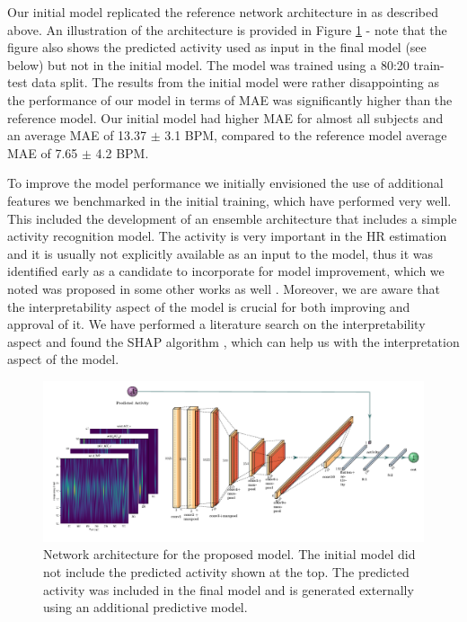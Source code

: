 \documentclass[12pt, conference]{IEEEtran}
\begin{document}
Our initial model replicated the reference network architecture in \cite{reiss2019deep} as described above. An illustration of the architecture is provided in Figure \ref{fig_3} - note that the figure also shows the predicted activity used as input in the final model (see below) but not in the initial model. The model was trained using a 80:20 train-test data split. The results from the initial model were rather disappointing as the performance of our model in terms of MAE was significantly higher than the reference model. Our initial model had higher MAE for almost all subjects and an average MAE of 13.37 $\pm$ 3.1 BPM, compared to the reference model average MAE of 7.65 $\pm$ 4.2 BPM.

To improve the model performance we initially envisioned the use of additional features we benchmarked in the initial training, which have performed very well. This included the development of an ensemble architecture that includes a simple activity recognition model. The activity is very important in the HR estimation and it is usually not explicitly available as an input to the model, thus it was identified early as a candidate to incorporate for model improvement, which we noted was proposed in some other works as well \cite{brophy2020optimised}. Moreover, we are aware that the interpretability aspect of the model is crucial for both improving and approval of it. We have performed a literature search on the interpretability aspect and found the SHAP algorithm \cite{lundberg2017unified}, which can help us with the interpretation aspect of the model.

\begin{figure}[!t]
  \centering
  \includegraphics[width=7in]{image4}
  \caption{Network architecture for the proposed model. The initial model did not include the predicted activity shown at the top. The predicted activity was included in the final model and is generated externally using an additional predictive model.}
  \label{fig_3}
  \end{figure}
\end{document}
